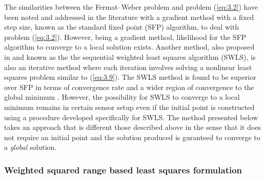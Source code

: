 The similarities between the Fermat--Weber problem and problem (\ref{eq:3.2}) have been noted and addressed in the literature \cite{BeckTeCh} with a gradient method with a fixed step size, known as the standard fixed point (SFP) algorithm, to deal with problem (\ref{eq:3.2}). However, being a gradient method, likelihood for the SFP algorithm to converge to a local solution exists. Another method, also proposed in \cite{BeckTeCh} and known  as the the sequential weighted least squares algorithm (SWLS), is also an iterative method where each iteration involves solving a nonlinear least squares problem similar to (\ref{eq:3.9}). The SWLS method is found to be superior over SFP in terms of convergence rate and a wider region of convergence to the global minimum \cite{BeckTeCh}. However, the possibility for SWLS to converge to a local minimum remains in certain sensor setup even if the initial point is constructed using a procedure developed specifically for SWLS. The method presented below takes an approach that is different those described above in the sense that it does not require an initial point and the solution produced is guranteed to converge to a \textit{global} solution. 

\subsubsection{Weighted squared range based least squares formulation} %

